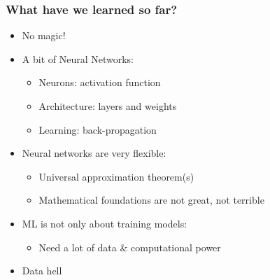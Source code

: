\begin{frame}
  \frametitle{What have we learned so far?}

  \begin{itemize}
  \item No magic!
  \item A bit of Neural Networks:
    \begin{itemize}
    \item Neurons: activation function
    \item Architecture: layers and weights
    \item Learning: back-propagation
    \end{itemize}
  \item Neural networks are very flexible:
    \begin{itemize}
    \item Universal approximation theorem(s)
    \item Mathematical foundations are not great, not terrible
    \end{itemize}
  \item ML is not only about training models:
    \begin{itemize}
    \item Need a lot of data \& computational power
    \end{itemize}
  \item Data hell
  \end{itemize}
\end{frame}
